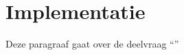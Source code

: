 \chapter{Implementatie}

\label{chapter6}

Deze paragraaf gaat over de deelvraag \enquote{\deelimplementatie}